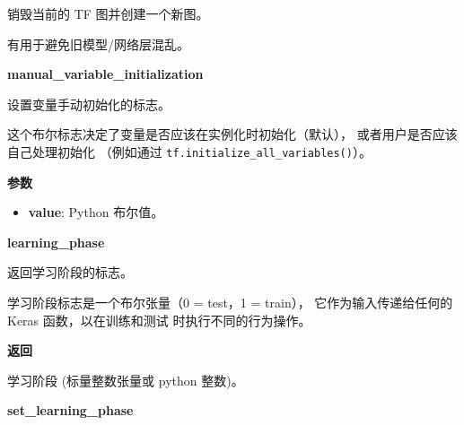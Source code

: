 \begin{Shaded}
\begin{Highlighting}[]
\end{Highlighting}
\end{Shaded}

销毁当前的 TF 图并创建一个新图。

有用于避免旧模型/网络层混乱。


\textbf{manual\_variable\_initialization}\label{manualux5fvariableux5finitialization}

\begin{Shaded}
\begin{Highlighting}[]
\end{Highlighting}
\end{Shaded}

设置变量手动初始化的标志。

这个布尔标志决定了变量是否应该在实例化时初始化（默认），
或者用户是否应该自己处理初始化 （例如通过
\texttt{tf.initialize\_all\_variables()}）。

\textbf{参数}

\begin{itemize}
\tightlist
\item
  \textbf{value}: Python 布尔值。
\end{itemize}


\textbf{learning\_phase}\label{learningux5fphase}

\begin{Shaded}
\begin{Highlighting}[]
\end{Highlighting}
\end{Shaded}

返回学习阶段的标志。

学习阶段标志是一个布尔张量（0 = test，1 = train），
它作为输入传递给任何的 Keras 函数，以在训练和测试 时执行不同的行为操作。

\textbf{返回}

学习阶段 (标量整数张量或 python 整数)。


\textbf{set\_learning\_phase}\label{setux5flearningux5fphase}

\begin{Shaded}
\begin{Highlighting}[]
\end{Highlighting}
\end{Shaded}

